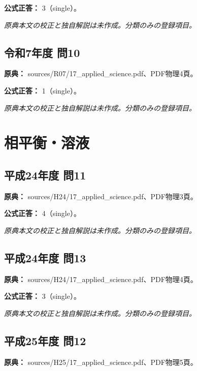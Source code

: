 \textbf{公式正答：} 3（single）。

\par\textit{原典本文の校正と独自解説は未作成。分類のみの登録項目。}

\subsection{令和7年度 問10}
\label{q:r07-reg-applied-10}

\noindent\textbf{原典：} sources/R07/17\_applied\_science.pdf、PDF物理4頁。

\textbf{公式正答：} 1（single）。

\par\textit{原典本文の校正と独自解説は未作成。分類のみの登録項目。}

\section{相平衡・溶液}

\subsection{平成24年度 問11}
\label{q:h24-reg-applied-11}

\noindent\textbf{原典：} sources/H24/17\_applied\_science.pdf、PDF物理3頁。

\textbf{公式正答：} 4（single）。

\par\textit{原典本文の校正と独自解説は未作成。分類のみの登録項目。}

\subsection{平成24年度 問13}
\label{q:h24-reg-applied-13}

\noindent\textbf{原典：} sources/H24/17\_applied\_science.pdf、PDF物理4頁。

\textbf{公式正答：} 3（single）。

\par\textit{原典本文の校正と独自解説は未作成。分類のみの登録項目。}

\subsection{平成25年度 問12}
\label{q:h25-reg-applied-12}

\noindent\textbf{原典：} sources/H25/17\_applied\_science.pdf、PDF物理5頁。

